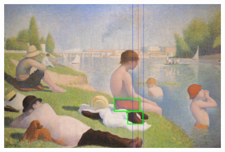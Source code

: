 \begin{figure}[h!!]
	\begin{center}
		\includegraphics[scale=0.3,angle=0]{afsnit/afprovning/billeder/naive_losning/naiv_mfarver_mdetaljer.png}
	\end{center}
	\caption[]{}
	\label{naiv_mfarver_mdetaljer}
\end{figure}

